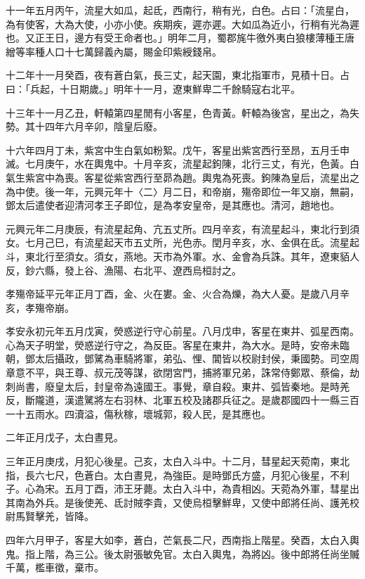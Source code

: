 \begin{pinyinscope}
十一年五月丙午，流星大如瓜，起氐，西南行，稍有光，白色。占曰：「流星白，為有使客，大為大使，小亦小使。疾期疾，遲亦遲。大如瓜為近小，行稍有光為遲也。又正王日，邊方有受王命者也。」明年二月，蜀郡旄牛徼外夷白狼樓薄種王唐繒等率種人口十七萬歸義內屬，賜金印紫綬錢帛。

十二年十一月癸酉，夜有蒼白氣，長三丈，起天園，東北指軍市，見積十日。占曰：「兵起，十日期歲。」明年十一月，遼東鮮卑二千餘騎寇右北平。

十三年十一月乙丑，軒轅第四星閒有小客星，色青黃。軒轅為後宮，星出之，為失勢。其十四年六月辛卯，陰皇后廢。

十六年四月丁未，紫宮中生白氣如粉絮。戊午，客星出紫宮西行至昂，五月壬申滅。七月庚午，水在輿鬼中。十月辛亥，流星起鉤陳，北行三丈，有光，色黃。白氣生紫宮中為喪。客星從紫宮西行至昴為趙。輿鬼為死喪。鉤陳為皇后，流星出之為中使。後一年，元興元年十〈二〉月二日，和帝崩，殤帝即位一年又崩，無嗣，鄧太后遣使者迎清河孝王子即位，是為孝安皇帝，是其應也。清河，趙地也。

元興元年二月庚辰，有流星起角、亢五丈所。四月辛亥，有流星起斗，東北行到須女。七月己巳，有流星起天市五丈所，光色赤。閏月辛亥，水、金俱在氐。流星起斗，東北行至須女。須女，燕地。天市為外軍。水、金會為兵誅。其年，遼東貊人反，鈔六縣，發上谷、漁陽、右北平、遼西烏桓討之。

孝殤帝延平元年正月丁酉，金、火在婁。金、火合為爍，為大人憂。是歲八月辛亥，孝殤帝崩。

孝安永初元年五月戊寅，熒惑逆行守心前星。八月戊申，客星在東井、弧星西南。心為天子明堂，熒惑逆行守之，為反臣。客星在東井，為大水。是時，安帝未臨朝，鄧太后攝政，鄧騭為車騎將軍，弟弘、悝、閶皆以校尉封侯，秉國勢。司空周章意不平，與王尊、叔元茂等謀，欲閉宮門，捕將軍兄弟，誅常侍鄭眾、蔡倫，劫刺尚書，廢皇太后，封皇帝為遠國王。事覺，章自殺。東井、弧皆秦地。是時羌反，斷隴道，漢遣騭將左右羽林、北軍五校及諸郡兵征之。是歲郡國四十一縣三百一十五雨水。四瀆溢，傷秋稼，壞城郭，殺人民，是其應也。

二年正月戊子，太白晝見。

三年正月庚戌，月犯心後星。己亥，太白入斗中。十二月，彗星起天菀南，東北指，長六七尺，色蒼白。太白晝見，為強臣。是時鄧氏方盛，月犯心後星，不利子。心為宋。五月丁酉，沛王牙薨。太白入斗中，為貴相凶。天菀為外軍，彗星出其南為外兵。是後使羌、氐討賊李貴，又使烏桓擊鮮卑，又使中郎將任尚、護羌校尉馬賢擊羌，皆降。

四年六月甲子，客星大如李，蒼白，芒氣長二尺，西南指上階星。癸酉，太白入輿鬼。指上階，為三公。後太尉張敏免官。太白入輿鬼，為將凶。後中郎將任尚坐贓千萬，檻車徵，棄巿。


\end{pinyinscope}
